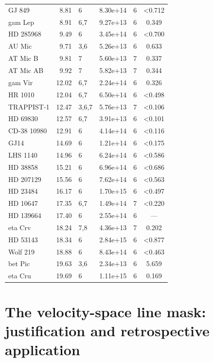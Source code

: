 \documentclass{openjournal}
\begin{document}
\begin{table}
\begin{tabular}{@{}lrlrlc@{}}
GJ 849 & 8.81 & 6 & 8.30e+14 & 6 & <0.712 \\
gam Lep & 8.91 & 6,7 & 9.27e+13 & 6 & 0.349 \\
HD 285968 & 9.49 & 6 & 3.45e+14 & 6 & <0.700 \\
AU Mic & 9.71 & 3,6 & 5.26e+13 & 6 & 0.633 \\
AT Mic B & 9.81 & 7 & 5.60e+13 & 7 & 0.337 \\
AT Mic AB & 9.92 & 7 & 5.82e+13 & 7 & 0.344 \\
gam Vir & 12.02 & 6,7 & 2.24e+14 & 6 & 0.326 \\
HR 1010 & 12.04 & 6,7 & 6.50e+14 & 6 & <0.498 \\
TRAPPIST-1 & 12.47 & 3,6,7 & 5.76e+13 & 7 & <0.106 \\
HD 69830 & 12.57 & 6,7 & 3.91e+13 & 6 & <0.101 \\
CD-38 10980 & 12.91 & 6 & 4.14e+14 & 6 & <0.116 \\
GJ14 & 14.69 & 6 & 1.21e+14 & 6 & <0.175 \\
LHS 1140 & 14.96 & 6 & 6.24e+14 & 6 & <0.586 \\
HD 38858 & 15.21 & 6 & 6.96e+14 & 6 & <0.686 \\
HD 207129 & 15.56 & 6 & 7.62e+14 & 6 & <0.563 \\
HD 23484 & 16.17 & 6 & 1.70e+15 & 6 & <0.497 \\
HD 10647 & 17.35 & 6,7 & 1.49e+14 & 7 & <0.220 \\
HD 139664 & 17.40 & 6 & 2.55e+14 & 6 & --- \\
eta Crv & 18.24 & 7,8 & 4.36e+13 & 7 & 0.202 \\
HD 53143 & 18.34 & 6 & 2.84e+15 & 6 & <0.877 \\
Wolf  219 & 18.88 & 6 & 8.43e+14 & 6 & <0.463 \\
bet Pic & 19.63 & 3,6 & 2.34e+13 & 6 & 5.659 \\
eta Cru & 19.69 & 6 & 1.11e+15 & 6 & 0.169 \\
\hline
\end{tabular}
\end{table}

\section{The velocity-space line mask: justification and retrospective application}
\label{app:linemask}
\end{document}
